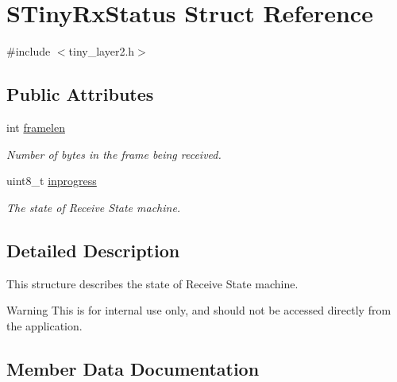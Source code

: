 \hypertarget{structSTinyRxStatus}{}\section{S\+Tiny\+Rx\+Status Struct Reference}
\label{structSTinyRxStatus}


{\ttfamily \#include $<$tiny\+\_\+layer2.\+h$>$}

\subsection*{Public Attributes}
\begin{DoxyCompactItemize}
\item 
int \hyperlink{structSTinyRxStatus_ad9f6055b8e74f10894c48ff2247f51c4}{framelen}
\begin{DoxyCompactList}\small\item\em Number of bytes in the frame being received. \end{DoxyCompactList}\item 
\hypertarget{structSTinyRxStatus_aaa956a3e43e12753ef43b76bb51d298e}{}uint8\+\_\+t \hyperlink{structSTinyRxStatus_aaa956a3e43e12753ef43b76bb51d298e}{inprogress}\label{structSTinyRxStatus_aaa956a3e43e12753ef43b76bb51d298e}

\begin{DoxyCompactList}\small\item\em The state of Receive State machine. \end{DoxyCompactList}\end{DoxyCompactItemize}


\subsection{Detailed Description}
This structure describes the state of Receive State machine. \begin{DoxyWarning}{Warning}
This is for internal use only, and should not be accessed directly from the application. 
\end{DoxyWarning}


\subsection{Member Data Documentation}
\hypertarget{structSTinyRxStatus_ad9f6055b8e74f10894c48ff2247f51c4}{}
